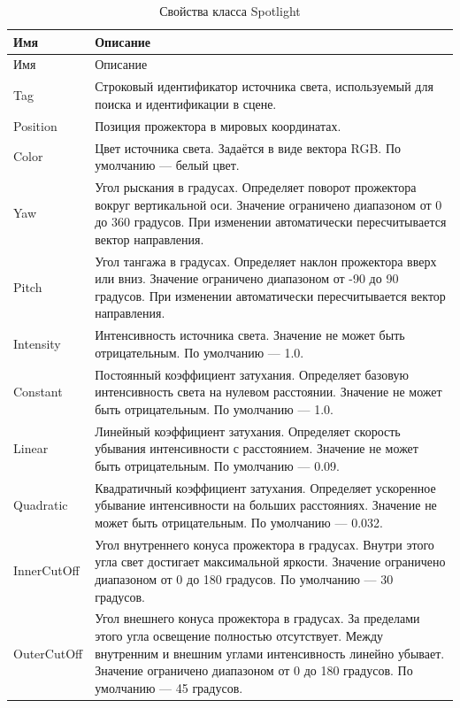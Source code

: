 \begin{xltabular}{\textwidth}{|>{\raggedright\arraybackslash}p{6cm}|>{\raggedright\arraybackslash}X|}
	\caption{Свойства класса Spotlight\label{SpotlightProperties:table}}\\ \hline
	\centrow Имя & \centrow Описание \\ \hline
	\endfirsthead
	\centrow Имя & \centrow Описание \\ \hline 
	\finishhead
	Tag & Строковый идентификатор источника света, используемый для поиска и идентификации в сцене. \\
	\hline
	Position & Позиция прожектора в мировых координатах. \\
	\hline
	Color & Цвет источника света. Задаётся в виде вектора RGB. По умолчанию — белый цвет. \\
	\hline
	Yaw & Угол рыскания в градусах. Определяет поворот прожектора вокруг вертикальной оси. Значение ограничено диапазоном от 0 до 360 градусов. При изменении автоматически пересчитывается вектор направления. \\
	\hline
	Pitch & Угол тангажа в градусах. Определяет наклон прожектора вверх или вниз. Значение ограничено диапазоном от -90 до 90 градусов. При изменении автоматически пересчитывается вектор направления. \\
	\hline
	Intensity & Интенсивность источника света. Значение не может быть отрицательным. По умолчанию — 1.0. \\
	\hline
	Constant & Постоянный коэффициент затухания. Определяет базовую интенсивность света на нулевом расстоянии. Значение не может быть отрицательным. По умолчанию — 1.0. \\
	\hline
	Linear & Линейный коэффициент затухания. Определяет скорость убывания интенсивности с расстоянием. Значение не может быть отрицательным. По умолчанию — 0.09. \\
	\hline
	Quadratic & Квадратичный коэффициент затухания. Определяет ускоренное убывание интенсивности на больших расстояниях. Значение не может быть отрицательным. По умолчанию — 0.032. \\
	\hline
	InnerCutOff & Угол внутреннего конуса прожектора в градусах. Внутри этого угла свет достигает максимальной яркости. Значение ограничено диапазоном от 0 до 180 градусов. По умолчанию — 30 градусов. \\
	\hline
	OuterCutOff & Угол внешнего конуса прожектора в градусах. За пределами этого угла освещение полностью отсутствует. Между внутренним и внешним углами интенсивность линейно убывает. Значение ограничено диапазоном от 0 до 180 градусов. По умолчанию — 45 градусов.
\end{xltabular}

